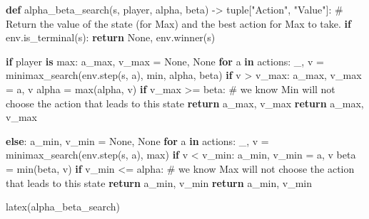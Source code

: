 \documentclass[
  letterpaper,
  DIV=11,
  numbers=noendperiod]{scrreprt}
\newenvironment{Shaded}{\begin{snugshade}}{\end{snugshade}}
\newcommand{\BuiltInTok}[1]{\textcolor[rgb]{0.00,0.23,0.31}{#1}}
\newcommand{\CommentTok}[1]{\textcolor[rgb]{0.37,0.37,0.37}{#1}}
\newcommand{\ControlFlowTok}[1]{\textcolor[rgb]{0.00,0.23,0.31}{\textbf{#1}}}
\newcommand{\KeywordTok}[1]{\textcolor[rgb]{0.00,0.23,0.31}{\textbf{#1}}}
\newcommand{\NormalTok}[1]{\textcolor[rgb]{0.00,0.23,0.31}{#1}}
\newcommand{\OperatorTok}[1]{\textcolor[rgb]{0.37,0.37,0.37}{#1}}
\newcommand{\StringTok}[1]{\textcolor[rgb]{0.13,0.47,0.30}{#1}}
\newcommand{\VariableTok}[1]{\textcolor[rgb]{0.07,0.07,0.07}{#1}}
\theoremstyle{plain}
\theoremstyle{plain}
\theoremstyle{definition}
\theoremstyle{definition}
\theoremstyle{remark}
\begin{document}
\begin{Shaded}
\begin{Highlighting}[]
\KeywordTok{def}\NormalTok{ alpha\_beta\_search(s, player, alpha, beta) }\OperatorTok{{-}\textgreater{}} \BuiltInTok{tuple}\NormalTok{[}\StringTok{"Action"}\NormalTok{, }\StringTok{"Value"}\NormalTok{]:}
    \CommentTok{\# Return the value of the state (for Max) and the best action for Max to take.}
    \ControlFlowTok{if}\NormalTok{ env.is\_terminal(s):}
        \ControlFlowTok{return} \VariableTok{None}\NormalTok{, env.winner(s)}

    \ControlFlowTok{if}\NormalTok{ player }\KeywordTok{is} \BuiltInTok{max}\NormalTok{:}
\NormalTok{        a\_max, v\_max }\OperatorTok{=} \VariableTok{None}\NormalTok{, }\VariableTok{None}
        \ControlFlowTok{for}\NormalTok{ a }\KeywordTok{in}\NormalTok{ actions:}
\NormalTok{            \_, v }\OperatorTok{=}\NormalTok{ minimax\_search(env.step(s, a), }\BuiltInTok{min}\NormalTok{, alpha, beta)}
            \ControlFlowTok{if}\NormalTok{ v }\OperatorTok{\textgreater{}}\NormalTok{ v\_max:}
\NormalTok{                a\_max, v\_max }\OperatorTok{=}\NormalTok{ a, v}
\NormalTok{                alpha }\OperatorTok{=} \BuiltInTok{max}\NormalTok{(alpha, v)}
            \ControlFlowTok{if}\NormalTok{ v\_max }\OperatorTok{\textgreater{}=}\NormalTok{ beta:}
                \CommentTok{\# we know Min will not choose the action that leads to this state}
                \ControlFlowTok{return}\NormalTok{ a\_max, v\_max}
        \ControlFlowTok{return}\NormalTok{ a\_max, v\_max}

    \ControlFlowTok{else}\NormalTok{:}
\NormalTok{        a\_min, v\_min }\OperatorTok{=} \VariableTok{None}\NormalTok{, }\VariableTok{None}
        \ControlFlowTok{for}\NormalTok{ a }\KeywordTok{in}\NormalTok{ actions:}
\NormalTok{            \_, v }\OperatorTok{=}\NormalTok{ minimax\_search(env.step(s, a), }\BuiltInTok{max}\NormalTok{)}
            \ControlFlowTok{if}\NormalTok{ v }\OperatorTok{\textless{}}\NormalTok{ v\_min:}
\NormalTok{                a\_min, v\_min }\OperatorTok{=}\NormalTok{ a, v}
\NormalTok{                beta }\OperatorTok{=} \BuiltInTok{min}\NormalTok{(beta, v)}
            \ControlFlowTok{if}\NormalTok{ v\_min }\OperatorTok{\textless{}=}\NormalTok{ alpha:}
                \CommentTok{\# we know Max will not choose the action that leads to this state}
                \ControlFlowTok{return}\NormalTok{ a\_min, v\_min}
        \ControlFlowTok{return}\NormalTok{ a\_min, v\_min}


\NormalTok{latex(alpha\_beta\_search)}
\end{Highlighting}
\end{Shaded}
\end{document}
